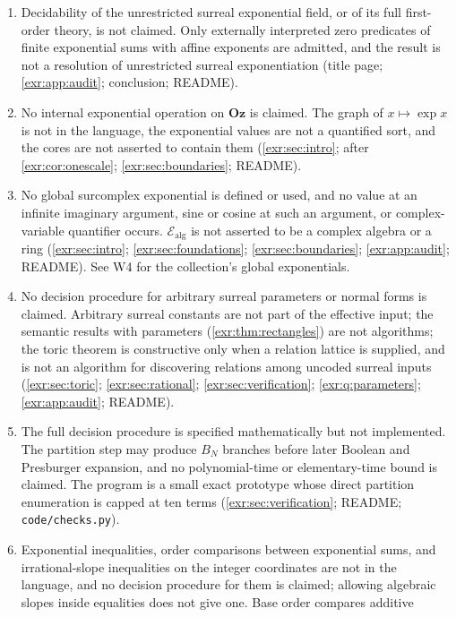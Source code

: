 \documentclass[11pt,letterpaper]{article}
\numberwithin{equation}{section}
\theoremstyle{definition}
\theoremstyle{remark}
\newcommand{\Oz}{\mathbf{Oz}}
\newcommand{\Ealg}{\mathcal E_{\mathrm{alg}}}
\newcommand{\rpath}[1]{\nolinkurl{#1}}%
\begin{document}
\begin{enumerate}[label=S\arabic*.,leftmargin=2.6em,itemsep=2pt]
\item Decidability of the unrestricted surreal exponential field, or of its
full first-order theory, is not claimed. Only externally interpreted zero
predicates of finite exponential sums with affine exponents are admitted, and
the result is not a resolution of unrestricted surreal exponentiation (title
page; \cref{exr:app:audit}; conclusion; README).
\item No internal exponential operation on $\Oz$ is claimed. The graph of
$x\mapsto\exp x$ is not in the language, the exponential values are not a
quantified sort, and the cores are not asserted to contain them
(\cref{exr:sec:intro}; after \cref{exr:cor:onescale};
\cref{exr:sec:boundaries}; README).
\item No global surcomplex exponential is defined or used, and no value at an
infinite imaginary argument, sine or cosine at such an argument, or
complex-variable quantifier occurs. $\Ealg$ is not asserted to be a complex
algebra or a ring (\cref{exr:sec:intro}; \cref{exr:sec:foundations};
\cref{exr:sec:boundaries}; \cref{exr:app:audit}; README). See W4 for the
collection's global exponentials.
\item No decision procedure for arbitrary surreal parameters or normal forms is
claimed. Arbitrary surreal constants are not part of the effective input; the
semantic results with parameters (\cref{exr:thm:rectangles}) are not
algorithms; the toric theorem is constructive only when a relation lattice is
supplied, and is not an algorithm for discovering relations among uncoded
surreal inputs (\cref{exr:sec:toric}; \cref{exr:sec:rational};
\cref{exr:sec:verification}; \cref{exr:q:parameters}; \cref{exr:app:audit};
README).
\item The full decision procedure is specified mathematically but not
implemented. The partition step may produce $B_N$ branches before later
Boolean and Presburger expansion, and no polynomial-time or elementary-time
bound is claimed. The program is a small exact prototype whose direct
partition enumeration is capped at ten terms (\cref{exr:sec:verification};
README; \rpath{code/checks.py}).
\item Exponential inequalities, order comparisons between exponential sums,
and irrational-slope inequalities on the integer coordinates are not in the
language, and no decision procedure for them is claimed; allowing algebraic
slopes inside equalities does not give one. Base order compares additive

\end{enumerate}
\end{document}
